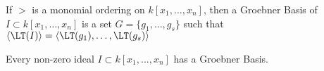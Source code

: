 \documentclass[crop=false,class=article,oneside]{standalone}
\begin{document}
        \begin{definition}
            If $>$ is a monomial ordering on $k[x_{1},\hdots,x_{n}]$,
            then a Groebner Basis of $I\subset k[x_{1},\hdots,x_{n}]$
            is a set $G=\{g_{1},\hdots,g_{s}\}$ such that
            $\langle\LT(I)\rangle%
             =\langle \LT(g_1),\hdots,\LT(g_s)\rangle$
        \end{definition}
        \begin{theorem}
            Every non-zero ideal
            $I\subset{k}[x_{1},\hdots,x_{n}]$
            has a Groebner Basis.
        \end{theorem}
\end{document}
